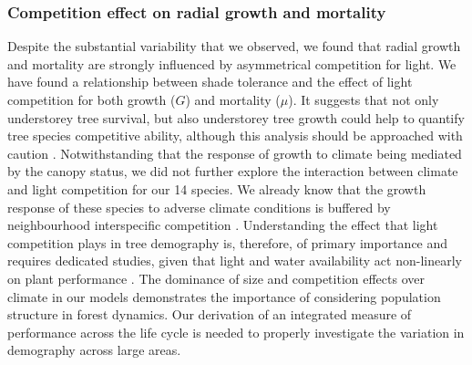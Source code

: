 \subsubsection{Competition effect on radial growth and mortality}
Despite the substantial variability that we observed, we found that radial growth and mortality are strongly influenced by asymmetrical competition for light. We have found a relationship between shade tolerance and the effect of light competition for both growth ($ G $) and mortality ($ \mu $). It suggests that not only understorey tree survival, but also understorey tree growth could help to quantify tree species competitive ability, although this analysis should be approached with caution \citep{Feng2018}. Notwithstanding that the response of growth to climate being mediated by the canopy status, we did not further explore the interaction between climate and light competition for our 14 species. We already know that the growth response of these species to adverse climate conditions is buffered by neighbourhood interspecific competition \citep{Aussenac2019}. Understanding the effect that light competition plays in tree demography is, therefore, of primary importance and requires dedicated studies, given that light and water availability act non-linearly on plant performance \citep{Holmgren2012}. The dominance of size and competition effects over climate in our models demonstrates the importance of considering population structure in forest dynamics. Our derivation of an integrated measure of performance across the life cycle is needed to properly investigate the variation in demography across large areas. \\

